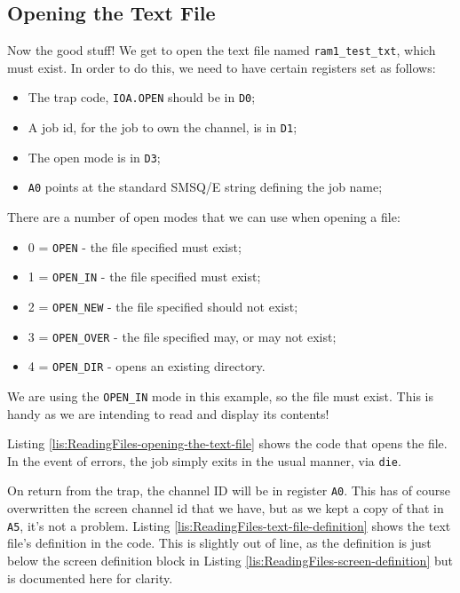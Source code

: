 \subsection{Opening the Text File}

Now the good stuff! We get to open the text file named \texttt{ram1\_test\_txt},
which must exist. In order to do this, we need to have certain registers
set as follows:
\begin{itemize}
\item The trap code, \texttt{IOA.OPEN} should be in \texttt{D0};
\item A job id, for the job to own the channel, is in \texttt{D1};
\item The open mode is in \texttt{D3};
\item \texttt{A0} points at the standard SMSQ/E string defining the job
name;
\end{itemize}
There are a number of open modes that we can use when opening a file:
\begin{itemize}
\item 0 = \texttt{OPEN} - the file specified must exist;
\item 1 = \texttt{OPEN\_IN} - the file specified must exist;
\item 2 = \texttt{OPEN\_NEW} - the file specified should not exist;
\item 3 = \texttt{OPEN\_OVER} - the file specified may, or may not exist;
\item 4 = \texttt{OPEN\_DIR} - opens an existing directory.
\end{itemize}
We are using the \texttt{OPEN\_IN} mode in this example, so the file
must exist. This is handy as we are intending to read and display
its contents!

Listing \ref{lis:ReadingFiles-opening-the-text-file} shows the code
that opens the file. In the event of errors, the job simply exits
in the usual manner, via \texttt{die}.



On return from the trap, the channel ID will be in register \texttt{A0}.
This has of course overwritten the screen channel id that we have,
but as we kept a copy of that in \texttt{A5}, it's not a problem.
Listing \ref{lis:ReadingFiles-text-file-definition} shows the text
file's definition in the code. This is slightly out of line, as the
definition is just below the screen definition block in Listing \ref{lis:ReadingFiles-screen-definition}
but is documented here for clarity.

